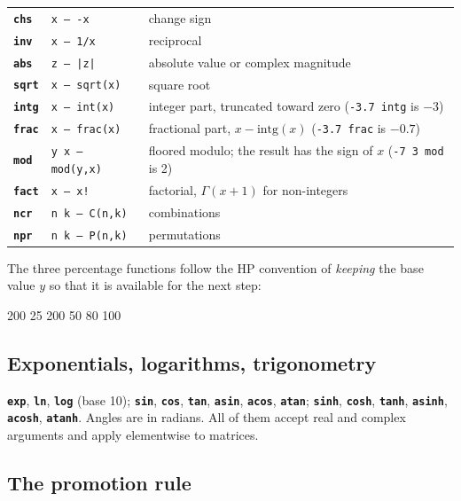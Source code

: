 \documentclass[11pt,letterpaper]{article}
\newcommand{\code}[1]{\texttt{#1}}
\newcommand{\cmd}[1]{\texttt{\textbf{#1}}}
\newcommand{\stk}[1]{\texttt{#1}}
\begin{document}
\begin{center}
\begin{tabular}{@{}llp{}@{}}
\toprule
\cmd{chs}  & \stk{x -- -x}   & change sign \\
\cmd{inv}  & \stk{x -- 1/x}  & reciprocal \\
\cmd{abs}  & \stk{z -- |z|}  & absolute value or complex magnitude \\
\cmd{sqrt} & \stk{x -- sqrt(x)} & square root \\
\cmd{intg} & \stk{x -- int(x)}  & integer part, truncated toward zero (\code{-3.7 intg} is $-3$) \\
\cmd{frac} & \stk{x -- frac(x)} & fractional part, $x - \mathrm{intg}(x)$ (\code{-3.7 frac} is $-0.7$) \\
\cmd{mod}  & \stk{y x -- mod(y,x)} & floored modulo; the result has the sign of $x$ (\code{-7 3 mod} is 2) \\
\cmd{fact} & \stk{x -- x!}   & factorial, $\Gamma(x+1)$ for non-integers \\
\cmd{ncr}  & \stk{n k -- C(n,k)} & combinations \\
\cmd{npr}  & \stk{n k -- P(n,k)} & permutations \\
\bottomrule
\end{tabular}
\end{center}

The three percentage functions follow the HP convention of \emph{keeping} the base value $y$ so that it is available for the next step:
\begin{rpn}
200 25 %
200 50 %
80 100 %
\end{rpn}

\subsection{Exponentials, logarithms, trigonometry}

\cmd{exp}, \cmd{ln}, \cmd{log} (base 10); \cmd{sin}, \cmd{cos}, \cmd{tan}, \cmd{asin}, \cmd{acos}, \cmd{atan}; \cmd{sinh}, \cmd{cosh}, \cmd{tanh}, \cmd{asinh}, \cmd{acosh}, \cmd{atanh}. Angles are in radians. All of them accept real and complex arguments and apply elementwise to matrices.

\subsection{The promotion rule}
\label{sec:promotion}
\end{document}
